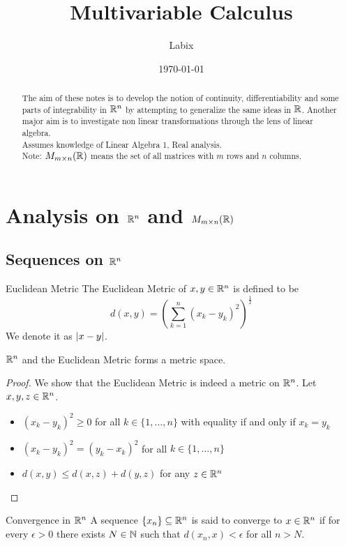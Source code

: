 \documentclass[a4paper]{article}
\title{Multivariable Calculus}
\author{Labix}
\date{\today}
\begin{document}
\maketitle
\begin{abstract}
The aim of these notes is to develop the notion of continuity, differentiability and some parts of integrability in $\mathbb{R}^n$ by attempting to generalize the same ideas in $\mathbb{R}$. Another major aim is to investigate non linear transformations  through the lens of linear algebra. \\
Assumes knowledge of Linear Algebra 1, Real analysis. \\
Note: $M_{m\times n}(\mathbb{R})$ means the set of all matrices with $m$ rows and $n$ columns. 
\end{abstract}
\pagebreak
\tableofcontents
\pagebreak
\section{Analysis on $\mathbb{R}^n$ and $M_{m\times n}(\mathbb{R})$}
\subsection{Sequences on $\mathbb{R}^n$}
\begin{defn}{Euclidean Metric}{} The Euclidean Metric of $x,y\in\mathbb{R}^n$ is defined to be $$d(x,y)=\left(\sum_{k=1}^n(x_k-y_k)^2\right)^{\frac{1}{2}}$$ We denote it as $\abs{x-y}$. 
\end{defn}

\begin{prp}{}{} $\mathbb{R}^n$ and the Euclidean Metric forms a metric space. 
\begin{proof} We show that the Euclidean Metric is indeed a metric on $\mathbb{R}^n$. Let $x,y,z\in\mathbb{R}^n$. 
\begin{itemize}
\item $(x_k-y_k)^2\geq 0$ for all $k\in\{1,\dots,n\}$ with equality if and only if $x_k=y_k$
\item $(x_k-y_k)^2=(y_k-x_k)^2$ for all $k\in\{1,\dots,n\}$
\item $d(x,y)\leq d(x,z)+d(y,z)$ for any $z\in\mathbb{R}^n$
\end{itemize}
\end{proof}
\end{prp}

\begin{defn}{Convergence in $\mathbb{R}^n$}{} A sequence $\{x_n\}\subseteq\mathbb{R}^n$ is said to converge to $x\in\mathbb{R}^n$ if for every $\epsilon>0$ there exists $N\in\mathbb{N}$ such that $d(x_n,x)<\epsilon$ for all $n>N$. 
\end{defn}
\end{document}
